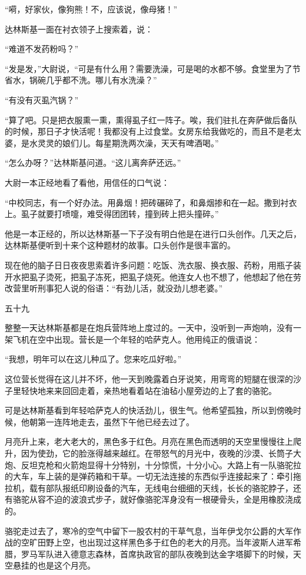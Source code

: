 “嗬，好家伙，像狗熊！不，应该说，像母猪！”

达林斯基一面在衬衣领子上搜索着，说：

“难道不发药粉吗？”

“发是发，”大尉说，“可是有什么用？需要洗澡，可是喝的水都不够。食堂里为了节省水，锅碗几乎都不洗。哪儿有水洗澡？”

“有没有灭虱汽锅？”

“算了吧。只是把衣服熏一熏，熏得虱子红一阵子。唉，我们驻扎在奔萨做后备队的时候，那日子才快活呢！我都没有上过食堂。女房东给我做吃的，而且不是老太婆，是水灵灵的娘们儿。每星期洗两次澡，天天有啤酒喝。”

“怎么办呀？”达林斯基问道。“这儿离奔萨还远。”

大尉一本正经地看了看他，用信任的口气说：

“中校同志，有一个好办法。用鼻烟！把砖碾碎了，和鼻烟掺和在一起。撒到衬衣上。虱子就要打喷嚏，难受得团团转，撞到砖上把头撞碎。”

他是一本正经的，所以达林斯基一下子没有明白他是在进行口头创作。几天之后，达林斯基便听到十来个这种题材的故事。口头创作是很丰富的。

现在他的脑子日日夜夜思索着许多问题：吃饭、洗衣服、换衣服、药粉，用瓶子装开水把虱子烫死，把虱子冻死，把虱子烧死。他连女人也不想了，他想起了他在劳改营里听刑事犯人说的俗语：“有劲儿活，就没劲儿想老婆。”

五十九

整整一天达林斯基都是在炮兵营阵地上度过的。一天中，没听到一声炮响，没有一架飞机在空中出现。营长是一个年轻的哈萨克人。他用纯正的俄语说：

“我想，明年可以在这儿种瓜了。您来吃瓜好啦。”

这位营长觉得在这儿并不坏，他一天到晚露着白牙说笑，用弯弯的短腿在很深的沙子里轻快地来来回回走着，亲热地看着站在油毡小屋旁边的上了套的骆驼。

可是达林斯基看到年轻哈萨克人的快活劲儿，很生气。他希望孤独，所以到傍晚时候，他朝第一连阵地走去，虽然下午他已经去过了。

月亮升上来，老大老大的，黑色多于红色。月亮在黑色而透明的天空里慢慢往上爬升，因为使劲，它的脸涨得越来越红。在带怒气的月光中，夜晚的沙漠、长筒子大炮、反坦克枪和火箭炮显得十分特别，十分惊慌，十分小心。大路上有一队骆驼拉的大车，车上装的是弹药箱和干草。一切无法连接的东西似乎连接起来了：牵引拖拉机，载有部队报纸印刷设备的汽车，无线电台细细的天线，长长的骆驼脖子，还有骆驼从容不迫的波浪式步子，就好像骆驼浑身没有一根硬骨头，全是用橡胶浇成的。

骆驼走过去了，寒冷的空气中留下一股农村的干草气息，当年伊戈尔公爵的大军作战的空旷田野上空，也出现过这样黑色多于红色的老大的月亮。当年波斯人进军希腊，罗马军队进入德意志森林，首席执政官的部队夜晚到达金字塔脚下的时候，天空悬挂的也是这个月亮。

